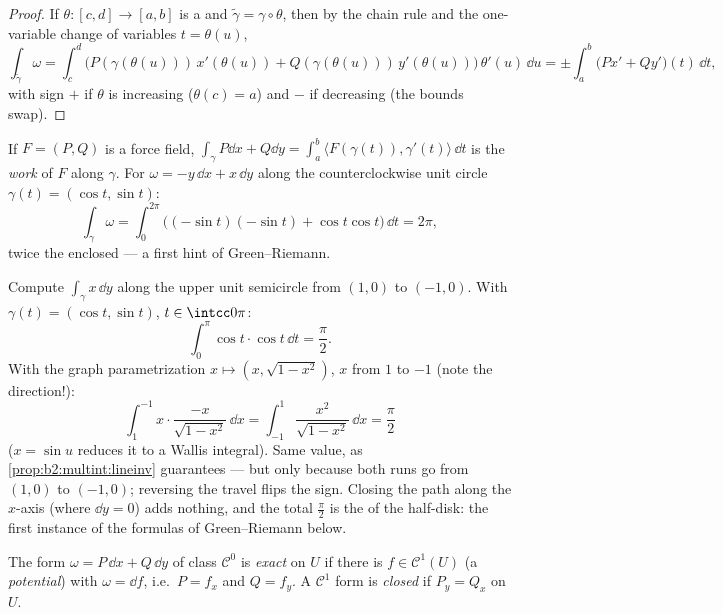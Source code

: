 \begin{proof}
If $\theta \colon [c, d] \to [a, b]$ is a  and
$\tilde\gamma = \gamma \circ \theta$, then by the chain rule and
the one-variable change of variables $t = \theta(u)$,
\[
\int_{\tilde\gamma}\omega
= \int_c^d \bigl(P(\gamma(\theta(u)))\,x'(\theta(u))
+ Q(\gamma(\theta(u)))\,y'(\theta(u))\bigr)\,\theta'(u)\,\dd u
= \pm\int_a^b \bigl(Px' + Qy'\bigr)(t)\,\dd t ,
\]
with sign $+$ if $\theta$ is increasing ($\theta(c) = a$) and $-$
if decreasing (the bounds swap).
\end{proof}

\begin{example}\label{ex:b2:multint:work}
If $F = (P, Q)$ is a force field, $\int_\gamma P\dd x + Q\dd y =
\int_a^b \langle F(\gamma(t)), \gamma'(t)\rangle\,\dd t$ is the
\emph{work} of $F$ along $\gamma$. For $\omega = -y\,\dd x +
x\,\dd y$ along the counterclockwise unit circle $\gamma(t) =
(\cos t, \sin t)$:
\[
\int_\gamma \omega
= \int_0^{2\pi}\bigl((-\sin t)(-\sin t)
+ \cos t\cos t\bigr)\,\dd t = 2\pi ,
\]
twice the enclosed  --- a first hint of Green--Riemann.
\end{example}

\begin{example}\label{ex:b2:multint:semicircle}
Compute $\int_\gamma x\,\dd y$ along the upper unit
semicircle from $(1, 0)$ to $(-1, 0)$. With $\gamma(t) =
(\cos t, \sin t)$, $t \in \intcc0\pi$:
\[
\int_0^\pi\cos t\cdot\cos t\,\dd t = \frac\pi2 .
\]
With the graph parametrization $x \mapsto (x, \sqrt{1 -
x^2})$, $x$ from $1$ to $-1$ (note the direction!):
\[
\int_1^{-1}x\cdot\frac{-x}{\sqrt{1 - x^2}}\,\dd x
= \int_{-1}^{1}\frac{x^2}{\sqrt{1 - x^2}}\,\dd x
= \frac\pi2
\]
($x = \sin u$ reduces it to a Wallis integral). Same value,
as \cref{prop:b2:multint:lineinv} guarantees --- but only
because both runs go from $(1,0)$ to $(-1,0)$; reversing the
travel flips the sign. Closing the path along the $x$-axis
(where $\dd y = 0$) adds nothing, and the total $\frac\pi2$
is the  of the half-disk: the first instance of the
 formulas of Green--Riemann below.
\end{example}

\begin{definition}\label{def:b2:multint:exact}
The form $\omega = P\,\dd x + Q\,\dd y$ of class $\mathcal{C}^0$
is \emph{exact} on $U$ if there is $f \in \mathcal{C}^1(U)$
(a \emph{potential}) with $\omega = \dd f$, i.e.\ $P = f_x$ and $Q
= f_y$. A $\mathcal{C}^1$ form is \emph{closed} if $P_y = Q_x$ on
$U$.
\end{definition}

